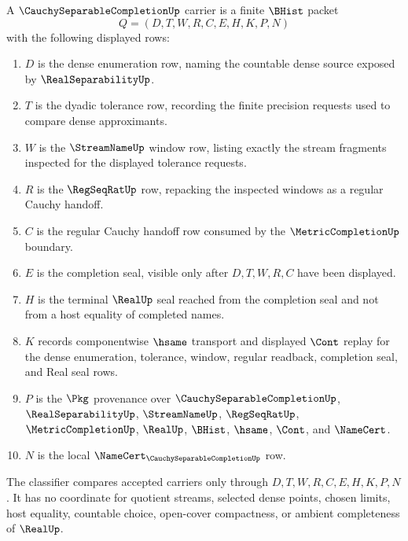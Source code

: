 \begin{definition}
\label{def:cauchy-separable-completion-carrier}
A $\CauchySeparableCompletionUp$ carrier is a finite $\BHist$ packet
$$
Q=(D,T,W,R,C,E,H,K,P,N)
$$
with the following displayed rows:
\begin{enumerate}
\item $D$ is the dense enumeration row, naming the countable dense source exposed by $\RealSeparabilityUp$.
\item $T$ is the dyadic tolerance row, recording the finite precision requests used to compare dense approximants.
\item $W$ is the $\StreamNameUp$ window row, listing exactly the stream fragments inspected for the displayed tolerance requests.
\item $R$ is the $\RegSeqRatUp$ row, repacking the inspected windows as a regular Cauchy handoff.
\item $C$ is the regular Cauchy handoff row consumed by the $\MetricCompletionUp$ boundary.
\item $E$ is the completion seal, visible only after $D,T,W,R,C$ have been displayed.
\item $H$ is the terminal $\RealUp$ seal reached from the completion seal and not from a host equality of completed names.
\item $K$ records componentwise $\hsame$ transport and displayed $\Cont$ replay for the dense enumeration, tolerance, window, regular readback, completion seal, and Real seal rows.
\item $P$ is the $\Pkg$ provenance over $\CauchySeparableCompletionUp$, $\RealSeparabilityUp$, $\StreamNameUp$, $\RegSeqRatUp$, $\MetricCompletionUp$, $\RealUp$, $\BHist$, $\hsame$, $\Cont$, and $\NameCert$.
\item $N$ is the local $\NameCert_{\CauchySeparableCompletionUp}$ row.
\end{enumerate}
The classifier compares accepted carriers only through $D,T,W,R,C,E,H,K,P,N$. It has no coordinate for quotient streams, selected dense points, chosen limits, host equality, countable choice, open-cover compactness, or ambient completeness of $\RealUp$.
\end{definition}

